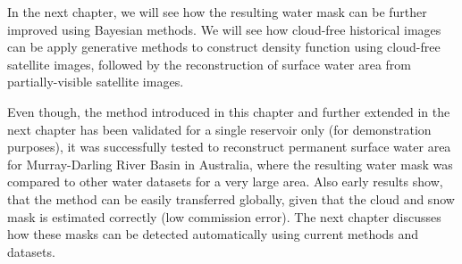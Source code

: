 In the next chapter, we will see how the resulting water mask can be further improved using Bayesian methods. We will see how cloud-free historical images can be apply generative methods to construct density function using cloud-free satellite images, followed by the reconstruction of surface water area from partially-visible satellite images.

Even though, the method introduced in this chapter and further extended in the next chapter has been validated for a single reservoir only (for demonstration purposes), it was successfully tested to reconstruct permanent surface water area for Murray-Darling River Basin in Australia, where the resulting water mask was compared to other water datasets for a very large area. Also early results show, that the method can be easily transferred globally, given that the cloud and snow mask is estimated correctly (low commission error). The next chapter discusses how these masks can be detected automatically using current methods and datasets.


